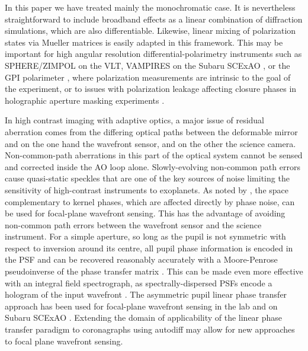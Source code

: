 \documentclass[modern]{aastex63}
\begin{document}
In this paper we have treated mainly the monochromatic case. It is nevertheless straightforward to include broadband effects as a linear combination of diffraction simulations, which are also differentiable. Likewise, linear mixing of polarization states via Mueller matrices is easily adapted in this framework. This may be important for high angular resolution differential-polarimetry instruments such as SPHERE/ZIMPOL \citep{zimpol} on the VLT, VAMPIRES on the Subaru SCExAO \citep{vampires}, or the GPI polarimeter \citep{gpipol}, where polarization measurements are intrinsic to the goal of the experiment, or to issues with polarization leakage affecting closure phases in holographic aperture masking experiments \citep[e.g.][]{doelman18}.

In high contrast imaging with adaptive optics, a major issue of residual aberration comes from the differing optical paths between the deformable mirror and on the one hand the wavefront sensor, and on the other the science camera. Non-common-path aberrations in this part of the optical system cannot be sensed and corrected inside the AO loop alone. Slowly-evolving non-common path errors cause quasi-static speckles that are one of the key sources of noise limiting the sensitivity of high-contrast instruments to exoplanets. As noted by \citet{martinache13}, the space complementary to kernel phases, which are affected directly by phase noise, can be used for focal-plane wavefront sensing. This has the advantage of avoiding non-common path errors between the wavefront sensor and the science instrument. For a simple aperture, so long as the pupil is not symmetric with respect to inversion around its centre, all pupil phase information is encoded in the PSF and can be recovered reasonably accurately with a Moore-Penrose pseudoinverse of the phase transfer matrix \citep{moore1920,bjerhammar1951,penrose_1955}. This can be made even more effective with an integral field spectrograph, as spectrally-dispersed PSFs encode a hologram of the input wavefront \citep{martinache16}. The asymmetric pupil linear phase transfer approach has been used for focal-plane wavefront sensing in the lab \citep[e.g.][]{pope14,swift} and on Subaru SCExAO \citep{martinache16b}. Extending the domain of applicability of the linear phase transfer paradigm to coronagraphs using autodiff may allow for new approaches to focal plane wavefront sensing. 
\end{document}
